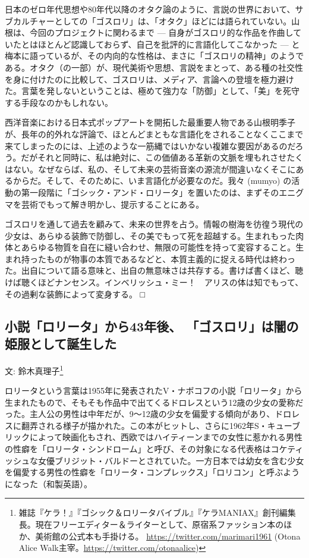 \documentclass[a6paper, 9pt, openright, titlepage, twoside]{ltjsarticle}
\begin{document}
日本のゼロ年代思想や80年代以降のオタク論のように、言説の世界において、サブカルチャーとしての「ゴスロリ」は、「オタク」ほどには語られていない。山根は、今回のプロジェクトに関わるまで --- 自身がゴスロリ的な作品を作曲していたとはほとんど認識しておらず、自己を批評的に言語化してこなかった --- と梅本に語っているが、その内向的な性格は、まさに「ゴスロリの精神」のようである。オタク（の一部）が、現代美術や思想、言説をまとって、ある種の社交性を身に付けたのに比較して、ゴスロリは、メディア、言論への登壇を極力避けた。言葉を発しないということは、極めて強力な「防御」として、「美」を死守する手段なのかもしれない。

西洋音楽における日本式ポップアートを開拓した最重要人物である山根明季子が、長年の的外れな評論で、ほとんどまともな言語化をされることなくここまで来てしまったのには、上述のような一筋縄ではいかない複雑な要因があるのだろう。だがそれと同時に、私は絶対に、この価値ある革新の文脈を埋もれさせたくはない。なぜならば、私の、そして未来の芸術音楽の源流が間違いなくそこにあるからだ。そして、そのために、いま言語化が必要なのだ。我々 (mumyo) の活動の第一段階に「ゴシック・アンド・ロリータ」を置いたのは、まずそのエニグマを芸術でもって解き明かし、提示することにある。

ゴスロリを通して過去を顧みて、未来の世界を占う。情報の樹海を彷徨う現代の少女は、あらゆる装飾で防御し、その美でもって死を超越する。生まれもった肉体とあらゆる物質を自在に縫い合わせ、無限の可能性を持って変容すること。生まれ持ったものが物事の本質であるなどと、本質主義的に捉える時代は終わった。出自について語る意味と、出自の無意味さは共存する。書けば書くほど、聴けば聴くほどナンセンス。インベリッシュ・ミー！　アリスの体は知でもって、その過剰な装飾によって変身する。 □ 

\newpage


\subsection*{小説「ロリータ」から43年後、 「ゴスロリ」は闇の姫服として誕生した}\label{suzuki}
{\small 文: 鈴木真理子}\footnote{
 雑誌『ケラ！』『ゴシック＆ロリータバイブル』『ケラMANIAX』創刊編集長。現在フリーエディター＆ライターとして、原宿系ファッション本のほか、美術館の公式本も手掛ける。
\url{https://twitter.com/marimari1961}
(Otona Alice Walk主宰。\url{https://twitter.com/otonaalice})}  


ロリータという言葉は1955年に発表されたV・ナボコフの小説「ロリータ」から生まれたもので、そもそも作品中で出てくるドロレスという12歳の少女の愛称だった。主人公の男性は中年だが、9～12歳の少女を偏愛する傾向があり、ドロレスに翻弄される様子が描かれた。この本がヒットし、さらに1962年S・キューブリックによって映画化もされ、西欧ではハイティーンまでの女性に惹かれる男性の性癖を「ロリータ・シンドローム」と呼び、その対象になる代表格はコケティッシュな女優ブリジット・バルドーとされていた。一方日本では幼女を含む少女を偏愛する男性の性癖を「ロリータ・コンプレックス」「ロリコン」と呼ぶようになった（和製英語）。
\end{document}
